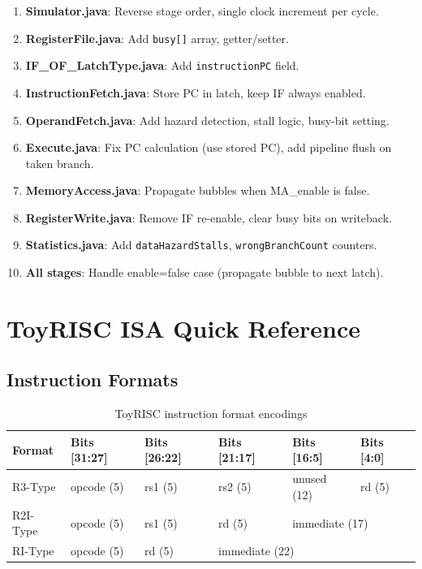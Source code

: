 \documentclass[12pt,a4paper]{article}
\begin{document}
\begin{tcolorbox}[colback=blue!5!white, colframe=blue!50!black, title=\textbf{Complete Change Checklist}]
\begin{enumerate}
    \item[\textbf{1.}] \textbf{Simulator.java}: Reverse stage order, single clock increment per cycle.
    \item[\textbf{2.}] \textbf{RegisterFile.java}: Add \texttt{busy[]} array, getter/setter.
    \item[\textbf{3.}] \textbf{IF\_OF\_LatchType.java}: Add \texttt{instructionPC} field.
    \item[\textbf{4.}] \textbf{InstructionFetch.java}: Store PC in latch, keep IF always enabled.
    \item[\textbf{5.}] \textbf{OperandFetch.java}: Add hazard detection, stall logic, busy-bit setting.
    \item[\textbf{6.}] \textbf{Execute.java}: Fix PC calculation (use stored PC), add pipeline flush on taken branch.
    \item[\textbf{7.}] \textbf{MemoryAccess.java}: Propagate bubbles when MA\_enable is false.
    \item[\textbf{8.}] \textbf{RegisterWrite.java}: Remove IF re-enable, clear busy bits on writeback.
    \item[\textbf{9.}] \textbf{Statistics.java}: Add \texttt{dataHazardStalls}, \texttt{wrongBranchCount} counters.
    \item[\textbf{10.}] \textbf{All stages}: Handle enable=false case (propagate bubble to next latch).
\end{enumerate}
\end{tcolorbox}

\newpage
\appendix

\section{ToyRISC ISA Quick Reference}

\subsection{Instruction Formats}

\begin{table}[H]
\centering
\begin{tabular}{@{}llllll@{}}
\toprule
\textbf{Format} & \textbf{Bits [31:27]} & \textbf{Bits [26:22]} & \textbf{Bits [21:17]} & \textbf{Bits [16:5]} & \textbf{Bits [4:0]} \\
\midrule
R3-Type  & opcode (5) & rs1 (5) & rs2 (5) & unused (12) & rd (5) \\
R2I-Type & opcode (5) & rs1 (5) & rd (5) & \multicolumn{2}{l}{immediate (17)} \\
RI-Type  & opcode (5) & rd (5) & \multicolumn{3}{l}{immediate (22)} \\
\bottomrule
\end{tabular}
\caption{ToyRISC instruction format encodings}
\end{table}
\end{document}
